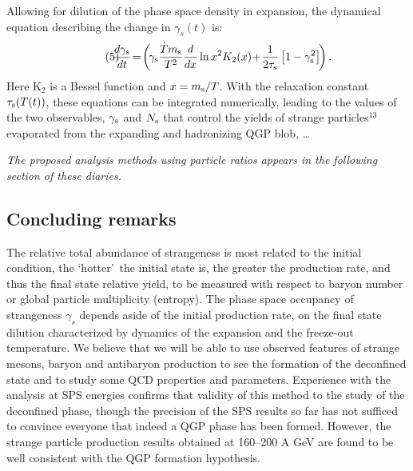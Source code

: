 \begin{mdframed}[linecolor=gray,roundcorner=12pt,backgroundcolor=Dandelion!15,linewidth=1pt,leftmargin=0cm,rightmargin=0cm,topline=true,bottomline=true,skipabove=12pt]
Allowing for dilution of the phase space density 
in expansion, the dynamical equation describing 
the change in $\gamma_{s}(t)$ is:
\begin{equation}\tag{5}\label{dgdtf}
\hspace*{-0.2cm}{{d\gamma_{\rm s}}\over{dt}}\!=\!
\left(\!\gamma_{\rm s}{{\dot T m_{\rm s}}\over T^2}
     {d\over{dx}}\ln x^2K_2(x)\!+\!
{1\over 2\tau_{\rm s}}\left[1-\gamma_{\rm s}^2\right]\!\right).
\end{equation}
Here K$_2$ is a Bessel function and $x=m_{\rm s}/T$. With the relaxation constant $\tau_{\rm s}(T(t))$, these equations can be integrated numerically, leading to the values of the two observables, $\gamma_{\rm s}$ and $N_{\rm s}$ that control the yields of strange particles$^{13}$ evaporated from the expanding and hadronizing QGP blob, \ldots
 
{\it The proposed analysis methods using particle ratios   appears in the following section of these diaries.}

\subsection*{Concluding remarks}
The relative total abundance of strangeness is most related to the initial condition, the \lq hotter\rq\ the initial state is, the greater the production rate, and thus the final state relative yield, to be measured with respect to  baryon number or global particle multiplicity (entropy). The phase space occupancy of strangeness $\gamma_{s}$ depends aside of the initial production rate, on the final state dilution characterized by dynamics of the expansion and the freeze-out temperature. We believe that we will be able to use observed  features of strange mesons,  baryon and antibaryon production to see the formation of the deconfined state and to study some QCD properties and parameters. Experience with the analysis at SPS energies confirms that validity of this method to the study of the deconfined phase, though the precision of the SPS results so far has not sufficed to convince everyone that indeed a QGP phase has been formed. However, the strange particle production results obtained at 160--200 A GeV are found to be well consistent with the QGP formation hypothesis. 

\end{mdframed}
